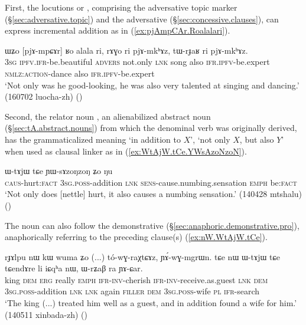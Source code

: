 First, the locutions  or , comprising the adversative topic marker  (§\ref{sec:adversative.topic}) and the adversative  (§\ref{sec:concessive.clauses}), can express incremental addition as in (\ref{ex:pjAmpCAr.Roalalari}).

\begin{exe}
\ex \label{ex:pjAmpCAr.Roalalari}
\gll ɯʑo [pjɤ-mpɕɤr] ʁo alala ri, rɤɣo ri pjɤ-mkʰɤz, tɯ-rɟaʁ ri pjɤ-mkʰɤz. \\
\textsc{3sg} \textsc{ipfv}.\textsc{ifr}-be.beautiful \textsc{advers} not.only \textsc{lnk} song also \textsc{ifr}.\textsc{ipfv}-be.expert \textsc{nmlz}:\textsc{action}-dance also \textsc{ifr}.\textsc{ipfv}-be.expert  \\
\glt `Not only was he good-looking, he was also very talented at singing and dancing.' (160702 luocha-zh)
()
\end{exe}

Second, the relator noun , an alienabilized abstract noun (§\ref{sec:tA.abstract.nouns}) from which the denominal verb  was originally derived, has the grammaticalized meaning `in addition to $X$', `not only $X$, but also $Y$' when used as clausal linker as in (\ref{ex:WtAjW.tCe.YWsAzoNzoN}).

\begin{exe}
\ex \label{ex:WtAjW.tCe.YWsAzoNzoN}
\gll  [ɕɯ-mŋɤm] ɯ-tɤjɯ tɕe ɲɯ-sɤzoŋzoŋ ʑo ŋu \\
\textsc{caus}-hurt:\textsc{fact} \textsc{3sg}.\textsc{poss}-addition \textsc{lnk} \textsc{sens}-cause.numbing.sensation \textsc{emph} be:\textsc{fact} \\
\glt `Not only does [nettle] hurt, it also causes a numbing sensation.' (140428 mtshalu)
()
\end{exe}

The noun  can also follow the demonstrative  (§\ref{sec:anaphoric.demonstrative.pro}), anaphorically referring to the preceding clause(s) (\ref{ex:nW.WtAjW.tCe}).

\begin{exe}
\ex \label{ex:nW.WtAjW.tCe}
\gll  rɟɤlpu nɯ kɯ wuma ʑo (...) tó-wɣ-raχtɕɤz, ɲɤ́-wɣ-mgrɯn. tɕe nɯ ɯ-tɤjɯ tɕe tɕendɤre li iɕqʰa nɯ, ɯ-rʑaβ ra ɲɤ-ɕar. \\
king \textsc{dem} \textsc{erg} really \textsc{emph} {  } \textsc{ifr}-\textsc{inv}-cherish \textsc{ifr}-\textsc{inv}-receive.as.guest \textsc{lnk} \textsc{dem} \textsc{3sg}.\textsc{poss}-addition \textsc{lnk} \textsc{lnk} again \textsc{filler} \textsc{dem} \textsc{3sg}.\textsc{poss}-wife \textsc{pl} \textsc{ifr}-search \\
\glt `The king (...) treated him well as a guest, and in addition found a wife for him.' (140511 xinbada-zh)
()
\end{exe}

